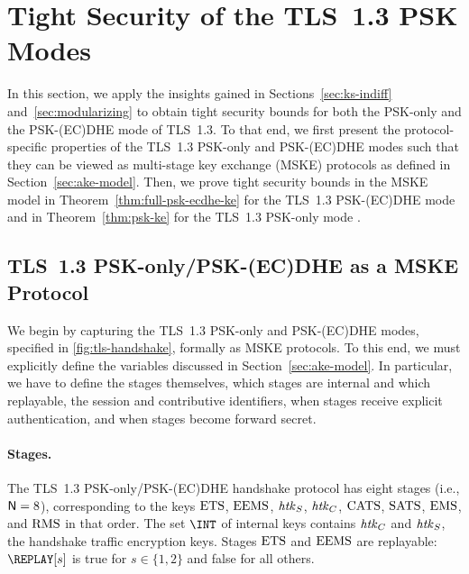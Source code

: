 \section{Tight Security of the TLS~1.3 PSK Modes}
\label{sec:ke-proof}

In this section, we apply the insights gained in Sections~\ref{sec:ks-indiff} and~\ref{sec:modularizing} to obtain tight security bounds for both the PSK-only and the PSK-(EC)DHE mode of TLS~1.3.
To that end, we first present the protocol-specific properties of the TLS~1.3 PSK-only and PSK-(EC)DHE modes such that they can be viewed as multi-stage key exchange (MSKE) protocols as defined in Section~\ref{sec:ake-model}.
Then, we prove tight security bounds in the MSKE model in Theorem~\ref{thm:full-psk-ecdhe-ke} for the TLS~1.3 PSK-(EC)DHE mode and 
	in Theorem~\ref{thm:psk-ke} 
for the TLS~1.3 PSK-only mode%
	.

\subsection{TLS~1.3 PSK-only/PSK-(EC)DHE as a MSKE Protocol}
\label{sec:tls-formal-def}

We begin by capturing the TLS~1.3 PSK-only and PSK-(EC)DHE modes, specified in \autoref{fig:tls-handshake}, formally as MSKE protocols.
To this end, we must explicitly define the variables discussed in Section~\ref{sec:ake-model}.
In particular, we have to define the stages themselves, which stages are internal and which replayable, the session and contributive identifiers, when stages receive explicit authentication, and when stages become forward secret.

\paragraph{Stages.}
The TLS~1.3 PSK-only/PSK-(EC)DHE handshake protocol has eight stages (i.e., $\mathsf{N} = 8$), corresponding to the keys $\mathrm{ETS}$, $\mathrm{EEMS}$, $\mathit{htk}_S$, $\mathit{htk}_C$, $\mathrm{CATS}$, $\mathrm{SATS}$, $\mathrm{EMS}$, and $\mathrm{RMS}$ in that order.
The set $\INT$ of internal keys contains $\mathit{htk}_C$ and $\mathit{htk}_S$, the handshake traffic encryption keys. 
Stages $\mathrm{ETS}$ and $\mathrm{EEMS}$ are replayable: $\REPLAY[s]$ is true for $s \in \{1,2\}$ and false for all others.

